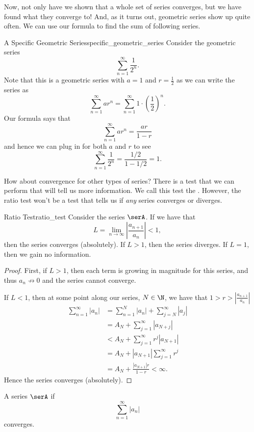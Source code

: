 Now, not only have we shown that a whole set of series converges, but we have found what they converge to! And, as it turns out, geometric series show up quite often.  We can use our formula to find the sum of following series.

\begin{ex}{A Specific Geometric Series}{specific_geometric_series}
Consider the geometric series
\[
\sum_{n=1}^\infty \frac{1}{2^n}.
\]
Note that this is a geometric series with $a=1$ and $r=\frac{1}{2}$ as we can write the series as
\[
\sum_{n=1}^\infty a r^n = \sum_{n=1}^\infty 1\cdot \left( \frac{1}{2}\right)^n.
\]
Our formula says that
\[
\sum_{n=1}^\infty ar^n = \frac{ar}{1-r}
\]
and hence we can plug in for both $a$ and $r$ to see
\[
\boxed{\sum_{n=1}^\infty \frac{1}{2^n}=\frac{1/2}{1-1/2}=1.}
\]
\end{ex}

How about convergence for other types of series? There is a test that we can perform that will tell us more information.  We call this test the . However, the ratio test won't be a test that tells us if \emph{any} series converges or diverges.

\begin{prop}{Ratio Test}{ratio_test}
Consider the series $\serA$. If we have that 
\[
L=\lim_{n\to \infty}\left| \frac{a_{n+1}}{a_n}\right|<1,
\]
then the series converges (absolutely).  If $L>1$, then the series diverges.  If $L=1$, then we gain no information.
\begin{proof}
First, if $L>1$, then each term is growing in magnitude for this series, and thus $a_n\not\to 0$ and the series cannot converge.

If $L<1$, then at some point along our series, $N\in \N$, we have that $1>r>\left| \frac{a_{n+1}}{a_n}\right|$
\begin{align*}
\sum_{n=1}^\infty |a_n| &= \sum_{n=1}^N |a_n| + \sum_{j=N}^\infty |a_j|\\
&= A_N + \sum_{j=1}^\infty |a_{N+j}|\\
&< A_N + \sum_{j=1}^\infty r^j |a_{N+1}|\\
&= A_N +|a_{N+1}| \sum_{j=1}^\infty r^j\\
&= A_N + \frac{|a_{N+1}|r}{1-r}<\infty.
\end{align*}
Hence the series converges (absolutely).
\end{proof}
\end{prop}

\begin{remark}
A series $\serA$  if 
\[
\sum_{n=1}^\infty |a_n| 
\]
converges.
\end{remark}


